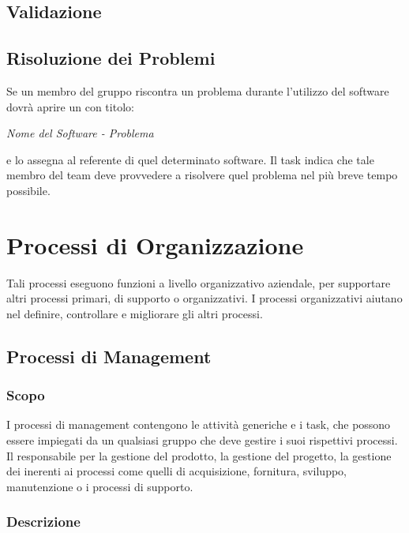 \documentclass[12pt,a4paper]{article}
\begin{document}
\subsection{Validazione} %

\subsection{Risoluzione dei Problemi}\label{Risoluzione dei Problemi} %
Se un membro del gruppo riscontra un problema durante l'utilizzo del software dovrà aprire un \textit{} con titolo:
\begin{center}
\emph{Nome del Software - Problema}
\end{center}
e lo assegna al referente di quel determinato software. Il task indica che tale membro del team deve provvedere a risolvere quel problema nel più breve tempo possibile.
\newpage

\section{Processi di Organizzazione} %

Tali processi eseguono funzioni a livello organizzativo aziendale, per supportare altri processi primari, di supporto o organizzativi.
I processi organizzativi aiutano nel definire, controllare e migliorare gli altri processi.

\subsection{Processi di Management}

\subsubsection{Scopo} %

I processi di management contengono le attività generiche e i task, che possono essere impiegati da un qualsiasi gruppo che deve gestire i suoi rispettivi processi. Il \PM{} responsabile per la gestione del prodotto, la gestione del progetto, la gestione dei \textit{} inerenti ai processi come quelli di acquisizione, fornitura, sviluppo, manutenzione o i processi di supporto.

\subsubsection{Descrizione} %
\end{document}
